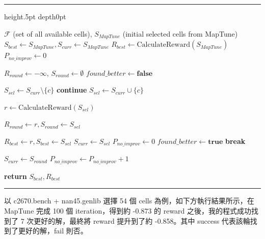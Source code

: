 \documentclass[12pt]{article}
\begin{document}
\begin{center}
\label{alg:local_search}
\hrule height.5pt depth0pt \kern4pt
\begin{algorithmic}[1]
\Require $\mathcal{F}$ (set of all available cells), $S_{MapTune}$ (initial selected cells from MapTune)
\State $S_{best} \gets S_{MapTune}, S_{curr} \gets S_{MapTune}$
\State $R_{best} \gets \text{CalculateReward}(S_{MapTune})$
\State $P_{no\_improv} \gets 0$ 

    \State $R_{round} \gets -\infty$, $S_{round} \gets \emptyset$
    \State $found\_better \gets \textbf{false}$

            \State $S_{sel} \gets S_{curr} \setminus \{c\}$ 
        \Else
                \State \textbf{continue} 
            \EndIf
            \State $S_{sel} \gets S_{curr} \cup \{c\}$ 
        \EndIf

        \State $r \gets \text{CalculateReward}(S_{sel})$
        
            \State $R_{round} \gets r, S_{round} \gets S_{sel}$
        \EndIf
        
            \State $R_{best} \gets r, S_{best} \gets S_{sel}$
            \State $S_{curr} \gets S_{sel}$
            \State $P_{no\_improv} \gets 0$
            \State $found\_better \gets \textbf{true}$
            \State \textbf{break} 
        \EndIf
    \EndFor

        \State $S_{curr} \gets S_{round}$ 
        \State $P_{no\_improv} \gets P_{no\_improv} + 1$
    \EndIf
\EndWhile

\State \textbf{return} $S_{best}, R_{best}$
\end{algorithmic}
\kern2pt\hrule\relax
\end{center}

以 c2670.bench + nan45.genlib 選擇 54 個 cells 為例，如下方執行結果所示，在 MapTune 完成 100 個 iteration，得到約 -0.873 的 reward 之後，我的程式成功找到了 7 次更好的解，最終將 reward 提升到了約 -0.858。其中 success 代表該輪找到了更好的解，fail 則否。
\end{document}
